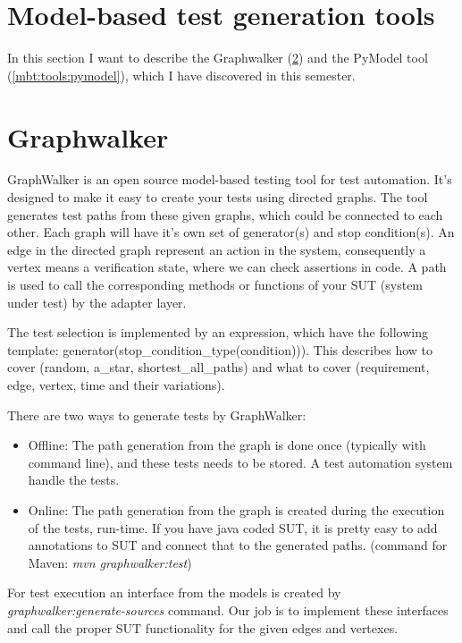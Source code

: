 \section{Model-based test generation tools}
In this section I want to describe the Graphwalker (\ref{mbt:tools:graphwalker}) and the PyModel tool (\ref{mbt:tools:pymodel}), which I have discovered in this semester.

\section{Graphwalker} \label{mbt:tools:graphwalker}

GraphWalker is an open source model-based testing tool for test automation. It's designed to make it easy to create your tests using directed graphs. The tool generates test paths from these given graphs, which could be connected to each other. Each graph will have it's own set of generator(s) and stop condition(s).  An edge in the directed graph represent an action in the system, consequently a vertex means a verification state, where we can check assertions in code. A path is used to call the corresponding methods or functions of your SUT (system under test) by the adapter layer. 

The test selection is implemented by an expression, which have the following template: generator(stop\_condition\_type(condition))). This describes how to cover (random, a\_star, shortest\_all\_paths) and what to cover (requirement, edge, vertex, time and their variations).



There are two ways to generate tests by GraphWalker:
\begin{itemize}
	\item Offline: The path generation from the graph is done once (typically with command line), and these tests needs to be stored. A test automation system handle the tests. 
	\item Online: The path generation from the graph is created during the execution of the tests, run-time. If you have java coded SUT, it is pretty easy to add annotations to SUT and connect that to the generated paths. (command for Maven: \textit{mvn graphwalker:test})
\end{itemize}

For test execution an interface from the models is created by \textit{graphwalker:generate-sources} command. Our job is to implement these interfaces and call the proper SUT functionality for the given edges and vertexes.

